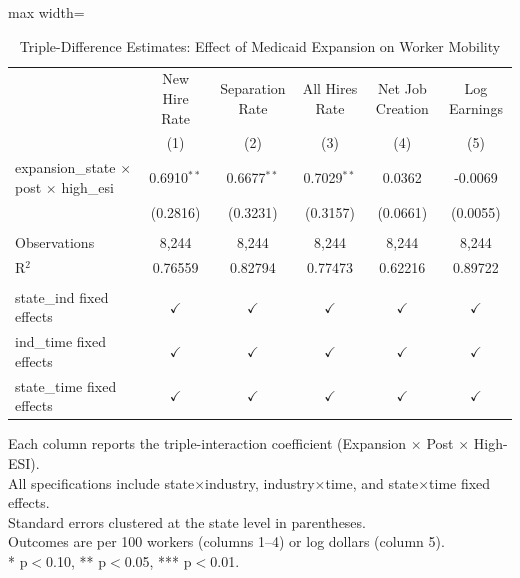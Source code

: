 
\begin{table}[htbp]
   \caption{\label{tab:ddd_main} Triple-Difference Estimates: Effect of Medicaid Expansion on Worker Mobility}
   \bigskip
   \centering
   \begin{adjustbox}{max width=\textwidth}
   \begin{tabular}{lccccc}
      \toprule
                                                            & New Hire Rate & Separation Rate & All Hires Rate & Net Job Creation & Log Earnings\\  
                                                            & (1)           & (2)             & (3)            & (4)              & (5)\\  
      \midrule 
      expansion\_state $\times$ post $\times$ high\_esi     & 0.6910$^{**}$ & 0.6677$^{**}$   & 0.7029$^{**}$  & 0.0362           & -0.0069\\   
                                                            & (0.2816)      & (0.3231)        & (0.3157)       & (0.0661)         & (0.0055)\\   
       \\
      Observations                                          & 8,244         & 8,244           & 8,244          & 8,244            & 8,244\\  
      R$^2$                                                 & 0.76559       & 0.82794         & 0.77473        & 0.62216          & 0.89722\\  
       \\
      state\_ind fixed effects                              & $\checkmark$  & $\checkmark$    & $\checkmark$   & $\checkmark$     & $\checkmark$\\   
      ind\_time fixed effects                               & $\checkmark$  & $\checkmark$    & $\checkmark$   & $\checkmark$     & $\checkmark$\\   
      state\_time fixed effects                             & $\checkmark$  & $\checkmark$    & $\checkmark$   & $\checkmark$     & $\checkmark$\\   
      \bottomrule
   \end{tabular}
   \end{adjustbox}
   
   \par \raggedright 
   Each column reports the triple-interaction coefficient (Expansion $\times$ Post $\times$ High-ESI).\\
   All specifications include state$\times$industry, industry$\times$time, and state$\times$time fixed effects.\\
   Standard errors clustered at the state level in parentheses.\\
   Outcomes are per 100 workers (columns 1--4) or log dollars (column 5).\\
   * p$<$0.10, ** p$<$0.05, *** p$<$0.01.
\end{table}


